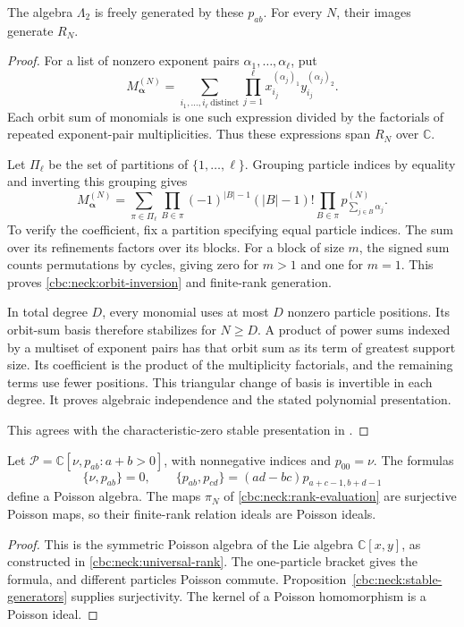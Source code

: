 \begin{proposition}\label{cbc:neck:stable-generators}
The algebra $\Lambda_2$ is freely generated by these $p_{ab}$.  For every
$N$, their images generate $R_N$.
\end{proposition}
\begin{proof}
For a list of nonzero exponent pairs $\alpha_1,\ldots,\alpha_\ell$, put
\[
 M_{\boldsymbol\alpha}^{(N)}
 =\sum_{i_1,\ldots,i_\ell\ \mathrm{distinct}}
 \prod_{j=1}^{\ell}x_{i_j}^{(\alpha_j)_1}y_{i_j}^{(\alpha_j)_2}.
\]
Each orbit sum of monomials is one such expression divided by the factorials
of repeated exponent-pair multiplicities.  Thus these expressions span
$R_N$ over $\mathbb C$.

Let $\Pi_\ell$ be the set of partitions of $\{1,\ldots,\ell\}$.  Grouping
particle indices by equality and inverting this grouping gives
\begin{equation}\label{cbc:neck:orbit-inversion}
 M_{\boldsymbol\alpha}^{(N)}
 =\sum_{\pi\in\Pi_\ell}
 \prod_{B\in\pi}(-1)^{|B|-1}(|B|-1)!
 \prod_{B\in\pi}p_{\sum_{j\in B}\alpha_j}^{(N)}.
\end{equation}
To verify the coefficient, fix a partition specifying equal particle indices.
The sum over its refinements factors over its blocks.  For a block of size
$m$, the signed sum counts permutations by cycles, giving zero for $m>1$
and one for $m=1$.  This proves \eqref{cbc:neck:orbit-inversion} and finite-rank
generation.

In total degree $D$, every monomial uses at most $D$ nonzero particle
positions.  Its orbit-sum basis therefore stabilizes for $N\geq D$.
A product of power sums indexed by a multiset of exponent pairs has that
orbit sum as its term of greatest support size.  Its coefficient is the
product of the multiplicity factorials, and the remaining terms use fewer
positions.  This triangular change of basis is invertible in each degree.
It proves algebraic independence and the stated polynomial presentation.

This agrees with the characteristic-zero stable presentation in
\cite[Corollary~3.5]{VaccarinoMultisymmetric}.
\end{proof}

\begin{theorem}\label{thm:stable-trace}
Let $\mathcal P=\mathbb C[\nu,p_{ab}:a+b>0]$, with nonnegative indices and
$p_{00}=\nu$.  The formulas
\[
 \{\nu,p_{ab}\}=0,\qquad
 \{p_{ab},p_{cd}\}=(ad-bc)p_{a+c-1,b+d-1}
\]
define a Poisson algebra.  The maps $\pi_N$ of
\eqref{cbc:neck:rank-evaluation} are surjective Poisson maps, so their
finite-rank relation ideals are Poisson ideals.
\end{theorem}
\begin{proof}
This is the symmetric Poisson algebra of the Lie algebra
$\mathbb C[x,y]$, as constructed in \eqref{cbc:neck:universal-rank}.
The one-particle bracket gives the formula, and different particles Poisson
commute.  Proposition~\ref{cbc:neck:stable-generators} supplies surjectivity.
The kernel of a Poisson homomorphism is a Poisson ideal.
\end{proof}

